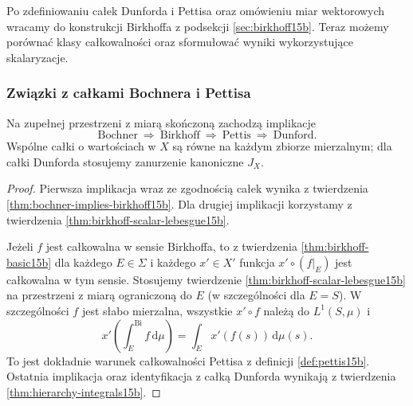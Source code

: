 Po zdefiniowaniu całek Dunforda i Pettisa oraz omówieniu
miar wektorowych wracamy do konstrukcji Birkhoffa z podsekcji
\ref{sec:birkhoff15b}. Teraz możemy porównać klasy
całkowalności oraz sformułować wyniki wykorzystujące skalaryzacje.

\subsubsection{Związki z całkami Bochnera i Pettisa}

\begin{twierdzenie}
\label{thm:birkhoff-hierarchy15b}
Na zupełnej przestrzeni z miarą skończoną zachodzą implikacje
\[
 \text{Bochner}\ \Longrightarrow\ \text{Birkhoff}\
 \Longrightarrow\ \text{Pettis}\ \Longrightarrow\ \text{Dunford}.
\]
Wspólne całki o wartościach w $X$ są równe na każdym
zbiorze mierzalnym; dla całki Dunforda stosujemy zanurzenie
kanoniczne $J_X$.
\end{twierdzenie}
\begin{proof}
Pierwsza implikacja wraz ze zgodnością całek wynika
z twierdzenia \ref{thm:bochner-implies-birkhoff15b}.
Dla drugiej implikacji korzystamy z twierdzenia
\ref{thm:birkhoff-scalar-lebesgue15b}.

Jeżeli $f$ jest całkowalna w sensie Birkhoffa,
to z twierdzenia \ref{thm:birkhoff-basic15b} dla każdego
$E\in\Sigma$ i każdego $x'\in X'$ funkcja $x'\circ(f|_E)$
jest całkowalna w tym sensie. Stosujemy twierdzenie
\ref{thm:birkhoff-scalar-lebesgue15b} na przestrzeni
z miarą ograniczoną do $E$ (w szczególności dla $E=S$).
W szczególności $f$ jest słabo mierzalna, wszystkie
$x'\circ f$ należą do $L^1(S,\mu)$ i
\[
 x'\left(\int_E^{\mathrm{Bi}} f\,\mathrm d\mu\right)
 =\int_E x'(f(s))\,\mathrm d\mu(s).
\]
To jest dokładnie warunek całkowalności Pettisa
z definicji \ref{def:pettis15b}.
Ostatnia implikacja oraz identyfikacja z całką Dunforda
wynikają z twierdzenia \ref{thm:hierarchy-integrals15b}.
\end{proof}

